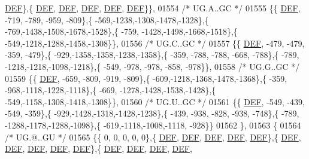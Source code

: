 \begin{DoxyCode}
      \mbox{\hyperlink{1_88_84__epars_8h_a397419fc12b37ed479c8abb9d444d843}{DEF}}\},\{  \mbox{\hyperlink{1_88_84__epars_8h_a397419fc12b37ed479c8abb9d444d843}{DEF}},  \mbox{\hyperlink{1_88_84__epars_8h_a397419fc12b37ed479c8abb9d444d843}{DEF}},  \mbox{\hyperlink{1_88_84__epars_8h_a397419fc12b37ed479c8abb9d444d843}{DEF}},  \mbox{\hyperlink{1_88_84__epars_8h_a397419fc12b37ed479c8abb9d444d843}{DEF}},  \mbox{\hyperlink{1_88_84__epars_8h_a397419fc12b37ed479c8abb9d444d843}{DEF}}\}\},
01554 \textcolor{comment}{/* UG.A..GC */}
01555 \{\{  \mbox{\hyperlink{1_88_84__epars_8h_a397419fc12b37ed479c8abb9d444d843}{DEF}}, -719, -789, -959, -809\},\{ -569,-1238,-1308,-1478,-1328\},\{ -769,-1438,-1508,-1678,-1528\},\{ -759,
      -1428,-1498,-1668,-1518\},\{ -549,-1218,-1288,-1458,-1308\}\},
01556 \textcolor{comment}{/* UG.C..GC */}
01557 \{\{  \mbox{\hyperlink{1_88_84__epars_8h_a397419fc12b37ed479c8abb9d444d843}{DEF}}, -479, -479, -359, -479\},\{ -929,-1358,-1358,-1238,-1358\},\{ -359, -788, -788, -668, -788\},\{ -789,
      -1218,-1218,-1098,-1218\},\{ -549, -978, -978, -858, -978\}\},
01558 \textcolor{comment}{/* UG.G..GC */}
01559 \{\{  \mbox{\hyperlink{1_88_84__epars_8h_a397419fc12b37ed479c8abb9d444d843}{DEF}}, -659, -809, -919, -809\},\{ -609,-1218,-1368,-1478,-1368\},\{ -359, -968,-1118,-1228,-1118\},\{ -669,
      -1278,-1428,-1538,-1428\},\{ -549,-1158,-1308,-1418,-1308\}\},
01560 \textcolor{comment}{/* UG.U..GC */}
01561 \{\{  \mbox{\hyperlink{1_88_84__epars_8h_a397419fc12b37ed479c8abb9d444d843}{DEF}}, -549, -439, -549, -359\},\{ -929,-1428,-1318,-1428,-1238\},\{ -439, -938, -828, -938, -748\},\{ -789,
      -1288,-1178,-1288,-1098\},\{ -619,-1118,-1008,-1118, -928\}\}
01562 \},
01563 \{
01564 \textcolor{comment}{/* UG.@..GU */}
01565 \{\{    0,    0,    0,    0,    0\},\{  \mbox{\hyperlink{1_88_84__epars_8h_a397419fc12b37ed479c8abb9d444d843}{DEF}},  \mbox{\hyperlink{1_88_84__epars_8h_a397419fc12b37ed479c8abb9d444d843}{DEF}},  \mbox{\hyperlink{1_88_84__epars_8h_a397419fc12b37ed479c8abb9d444d843}{DEF}},  \mbox{\hyperlink{1_88_84__epars_8h_a397419fc12b37ed479c8abb9d444d843}{DEF}},  \mbox{\hyperlink{1_88_84__epars_8h_a397419fc12b37ed479c8abb9d444d843}{DEF}}\},\{  
      \mbox{\hyperlink{1_88_84__epars_8h_a397419fc12b37ed479c8abb9d444d843}{DEF}},  \mbox{\hyperlink{1_88_84__epars_8h_a397419fc12b37ed479c8abb9d444d843}{DEF}},  \mbox{\hyperlink{1_88_84__epars_8h_a397419fc12b37ed479c8abb9d444d843}{DEF}},  \mbox{\hyperlink{1_88_84__epars_8h_a397419fc12b37ed479c8abb9d444d843}{DEF}},  \mbox{\hyperlink{1_88_84__epars_8h_a397419fc12b37ed479c8abb9d444d843}{DEF}}\},\{  \mbox{\hyperlink{1_88_84__epars_8h_a397419fc12b37ed479c8abb9d444d843}{DEF}},  \mbox{\hyperlink{1_88_84__epars_8h_a397419fc12b37ed479c8abb9d444d843}{DEF}},  \mbox{\hyperlink{1_88_84__epars_8h_a397419fc12b37ed479c8abb9d444d843}{DEF}},  \mbox{\hyperlink{1_88_84__epars_8h_a397419fc12b37ed479c8abb9d444d843}{DEF}},  

\end{DoxyCode}
